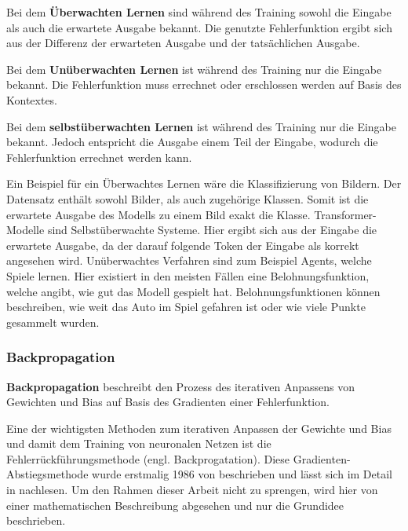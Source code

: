 \begin{definition}\label{def:ueberwachtes-lernen}
    Bei dem \textbf{Überwachten Lernen} sind während des Training sowohl die Eingabe als auch die erwartete Ausgabe bekannt.
    Die genutzte Fehlerfunktion ergibt sich aus der Differenz der erwarteten Ausgabe und der tatsächlichen Ausgabe.
\end{definition}

\begin{definition}\label{def:unueberwachtes-lernen}
    Bei dem \textbf{Unüberwachten Lernen} ist während des Training nur die Eingabe bekannt.
    Die Fehlerfunktion muss errechnet oder erschlossen werden auf Basis des Kontextes.
\end{definition}

\begin{definition}\label{def:selbstueberwachtes-lernen}
    Bei dem \textbf{selbstüberwachten Lernen} ist während des Training nur die Eingabe bekannt.
    Jedoch entspricht die Ausgabe einem Teil der Eingabe, wodurch die Fehlerfunktion errechnet werden kann.
\end{definition}

Ein Beispiel für ein Überwachtes Lernen wäre die Klassifizierung von Bildern.
Der Datensatz enthält sowohl Bilder, als auch zugehörige Klassen.
Somit ist die erwartete Ausgabe des Modells zu einem Bild exakt die Klasse.
Transformer-Modelle sind Selbstüberwachte Systeme.
Hier ergibt sich aus der Eingabe die erwartete Ausgabe, da der darauf folgende Token der Eingabe als korrekt angesehen wird.
Unüberwachtes Verfahren sind zum Beispiel Agents, welche Spiele lernen.
Hier existiert in den meisten Fällen eine Belohnungsfunktion, welche angibt, wie gut das Modell gespielt hat.
Belohnungsfunktionen können beschreiben, wie weit das Auto im Spiel gefahren ist oder wie viele Punkte gesammelt wurden.\\

\subsubsection{Backpropagation}
\begin{definition}\label{def:backpropagation}
    \textbf{Backpropagation} beschreibt den Prozess des iterativen Anpassens von Gewichten und Bias auf Basis des Gradienten einer Fehlerfunktion.
\end{definition}

Eine der wichtigsten Methoden zum iterativen Anpassen der Gewichte und Bias und damit dem Training von neuronalen Netzen ist die Fehlerrückführungsmethode (engl. Backprogatation).
Diese Gradienten-Abstiegsmethode wurde erstmalig 1986 von \citet{backpropagation} beschrieben und lässt sich im Detail in \citet{neuronale-netze} nachlesen.
Um den Rahmen dieser Arbeit nicht zu sprengen, wird hier von einer mathematischen Beschreibung abgesehen und nur die Grundidee beschrieben.\\

